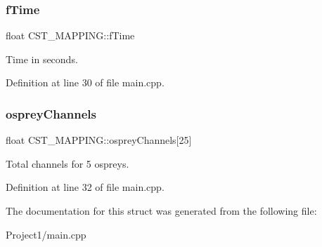 \subsubsection{\texorpdfstring{f\+Time}{fTime}}
{\footnotesize\ttfamily float C\+S\+T\+\_\+\+M\+A\+P\+P\+I\+N\+G\+::f\+Time}



Time in seconds. 



Definition at line 30 of file main.\+cpp.

\mbox{\label{struct_c_s_t___m_a_p_p_i_n_g_a15a94aba68ce13addacd8a8541fee0e5}} 
\subsubsection{\texorpdfstring{osprey\+Channels}{ospreyChannels}}
{\footnotesize\ttfamily float C\+S\+T\+\_\+\+M\+A\+P\+P\+I\+N\+G\+::osprey\+Channels\mbox{[}25\mbox{]}}



Total channels for 5 ospreys. 



Definition at line 32 of file main.\+cpp.



The documentation for this struct was generated from the following file\+:\begin{DoxyCompactItemize}
\item 
Project1/main.\+cpp\end{DoxyCompactItemize}
